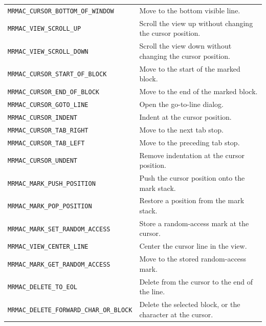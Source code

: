 \documentclass[a4paper,10pt,twoside,openany]{book}
\newenvironment{mrmacextension}{\begin{changebar}}{\end{changebar}}
\begin{document}
\begin{mrmacextension}
\begin{longtable}{@{}L{0.50\textwidth}@{\hspace{0.8em}}L{0.40\textwidth}@{}}
\texttt{MRMAC\_CURSOR\_BOTTOM\_OF\_WINDOW} & Move to the bottom visible line. \\
\texttt{MRMAC\_VIEW\_SCROLL\_UP} & Scroll the view up without changing the cursor position. \\
\texttt{MRMAC\_VIEW\_SCROLL\_DOWN} & Scroll the view down without changing the cursor position. \\
\texttt{MRMAC\_CURSOR\_START\_OF\_BLOCK} & Move to the start of the marked block. \\
\texttt{MRMAC\_CURSOR\_END\_OF\_BLOCK} & Move to the end of the marked block. \\
\texttt{MRMAC\_CURSOR\_GOTO\_LINE} & Open the go-to-line dialog. \\
\texttt{MRMAC\_CURSOR\_INDENT} & Indent at the cursor position. \\
\texttt{MRMAC\_CURSOR\_TAB\_RIGHT} & Move to the next tab stop. \\
\texttt{MRMAC\_CURSOR\_TAB\_LEFT} & Move to the preceding tab stop. \\
\texttt{MRMAC\_CURSOR\_UNDENT} & Remove indentation at the cursor position. \\
\texttt{MRMAC\_MARK\_PUSH\_POSITION} & Push the cursor position onto the mark stack. \\
\texttt{MRMAC\_MARK\_POP\_POSITION} & Restore a position from the mark stack. \\
\texttt{MRMAC\_MARK\_SET\_RANDOM\_ACCESS} & Store a random-access mark at the cursor. \\
\texttt{MRMAC\_VIEW\_CENTER\_LINE} & Center the cursor line in the view. \\
\texttt{MRMAC\_MARK\_GET\_RANDOM\_ACCESS} & Move to the stored random-access mark. \\
\texttt{MRMAC\_DELETE\_TO\_EOL} & Delete from the cursor to the end of the line. \\
\texttt{MRMAC\_DELETE\_FORWARD\_CHAR\_OR\_BLOCK} & Delete the selected block, or the character at the cursor. \\

\end{longtable}
\end{mrmacextension}
\end{document}
